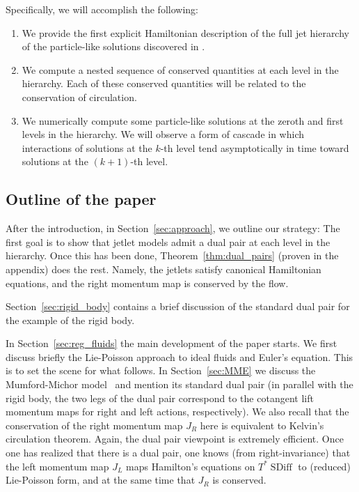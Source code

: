 \documentclass[12pt]{amsart}
\DeclareMathOperator{\SDiff}{SDiff}
\begin{document}
 Specifically, we will accomplish the following:
\begin{enumerate}
  \item We provide the first explicit Hamiltonian description of the full jet hierarchy of the particle-like solutions discovered in 
  	\cite{JacobsRatiuDesbrun2013,CotterHolmJacobsMeier2014}.
  \item We compute a nested sequence of conserved quantities at 
    each level in the hierarchy.
    Each of these conserved quantities will be related to the conservation
    of circulation.
  \item We numerically compute some particle-like solutions at the zeroth and first levels in the hierarchy.  We will observe a form of cascade in which interactions of solutions at the $k$-th level tend asymptotically in time toward solutions at the $(k+1)$-th level.
\end{enumerate}

\subsection{Outline of the paper}
After the introduction, in Section~\ref{sec:approach}, we outline our strategy: The first goal is to show that jetlet models admit a dual pair at each level in the hierarchy. Once this has been done, Theorem~\ref{thm:dual_pairs} (proven in the appendix) does the rest. Namely, the jetlets satisfy canonical Hamiltonian equations, and the right momentum map is conserved by the flow.

Section~\ref{sec:rigid_body} contains a brief discussion of the standard dual pair for the example of the  rigid body.

In Section~\ref{sec:reg_fluids} the main development of the paper starts. We first discuss briefly the Lie-Poisson approach to ideal fluids and Euler's equation. This is to set the scene for what follows. In Section~\ref{sec:MME} we discuss the Mumford-Michor model~\cite{MumfordMichor2013} and mention its standard dual pair (in parallel with the rigid body, the two legs of the dual pair correspond to the cotangent lift momentum maps for right and left actions, respectively).
We also recall that the conservation of the right momentum map $J_R$ here is equivalent to Kelvin's circulation theorem. Again, the dual pair viewpoint is extremely efficient. Once one has realized that there is a dual pair, one knows (from right-invariance) that the left momentum map $J_L$ maps Hamilton's equations on $T^*\SDiff$ to (reduced) Lie-Poisson form, and at the same time that $J_R$ is conserved.
\end{document}

